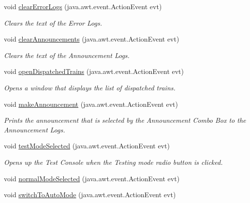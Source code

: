 \begin{DoxyCompactItemize}
void \hyperlink{classTrainControllerComps_1_1TrainController_a7b660e7359f41a2b4cb40e828332abdd}{clear\+Error\+Logs} (java.\+awt.\+event.\+Action\+Event evt)
\begin{DoxyCompactList}\small\item\em Clears the text of the Error Logs. \end{DoxyCompactList}\item 
void \hyperlink{classTrainControllerComps_1_1TrainController_ac2865f3988db31c31b26b7be49289149}{clear\+Announcements} (java.\+awt.\+event.\+Action\+Event evt)
\begin{DoxyCompactList}\small\item\em Clears the text of the Announcement Logs. \end{DoxyCompactList}\item 
void \hyperlink{classTrainControllerComps_1_1TrainController_a917139f8b8d210b2093f8249ef58eff1}{open\+Dispatched\+Trains} (java.\+awt.\+event.\+Action\+Event evt)
\begin{DoxyCompactList}\small\item\em Opens a window that displays the list of dispatched trains. \end{DoxyCompactList}\item 
void \hyperlink{classTrainControllerComps_1_1TrainController_a754224a8b34116cffd0c39ed93a92f5e}{make\+Announcement} (java.\+awt.\+event.\+Action\+Event evt)
\begin{DoxyCompactList}\small\item\em Prints the announcement that is selected by the Announcement Combo Box to the Announcement Logs. \end{DoxyCompactList}\item 
void \hyperlink{classTrainControllerComps_1_1TrainController_abf8b94be97c22b9811d9103e880a58a3}{test\+Mode\+Selected} (java.\+awt.\+event.\+Action\+Event evt)
\begin{DoxyCompactList}\small\item\em Opens up the Test Console when the Testing mode radio button is clicked. \end{DoxyCompactList}\item 
void \hyperlink{classTrainControllerComps_1_1TrainController_add9a237c1fd6d40484f79d43f22517a0}{normal\+Mode\+Selected} (java.\+awt.\+event.\+Action\+Event evt)
\item 
void \hyperlink{classTrainControllerComps_1_1TrainController_ad0b5d77b76c1544d73359a2997071e78}{switch\+To\+Auto\+Mode} (java.\+awt.\+event.\+Action\+Event evt)

\end{DoxyCompactItemize}
